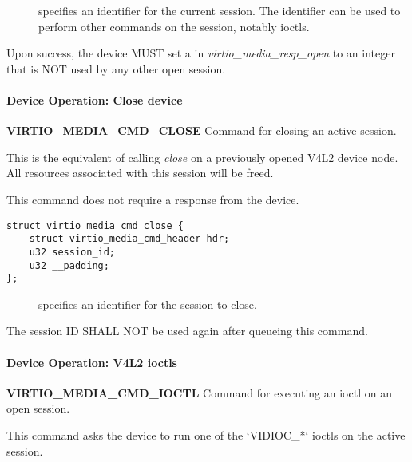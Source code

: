 \begin{description}
\item[] specifies an identifier for the current session. The
identifier can be used to perform other commands on the session, notably ioctls.
\end{description}


Upon success, the device MUST set a  in \textit{virtio_media_resp_open}
to an integer that is NOT used by any other open session.

\paragraph{Device Operation: Close device}

\textbf{VIRTIO_MEDIA_CMD_CLOSE} Command for closing an active session.

This is the equivalent of calling \textit{close} on a previously opened V4L2
device node. All resources associated with this session will be freed.

This command does not require a response from the device.

\begin{lstlisting}
struct virtio_media_cmd_close {
    struct virtio_media_cmd_header hdr;
    u32 session_id;
    u32 __padding;
};
\end{lstlisting}

\begin{description}
\item[] specifies an identifier for the session to close.
\end{description}


The session ID SHALL NOT be used again after queueing this command.

\paragraph{Device Operation: V4L2 ioctls}

\textbf{VIRTIO_MEDIA_CMD_IOCTL} Command for executing an ioctl on an open
session.

This command asks the device to run one of the `VIDIOC_*` ioctls on the active
session.

